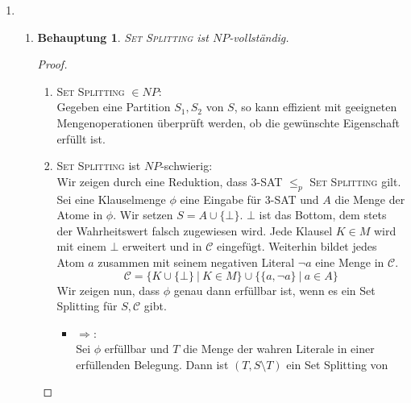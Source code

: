 \documentclass[a4paper]{scrartcl}
\newtheorem*{proposition}{Behauptung}
\begin{document}
\begin{enumerate}[label=\bfseries \arabic*.]
\item %
\begin{enumerate}
    \item %
        \begin{proposition}
            \textsc{Set Splitting} ist $NP$-vollständig.
        \end{proposition}
        \begin{proof}
            \hfill \\
            \begin{enumerate}
                \item \textsc{Set Splitting} $\in NP$: \\
                    Gegeben eine Partition $S_1,S_2$ von $S$, so kann effizient
                    mit geeigneten Mengenoperationen überprüft werden, ob die
                    gewünschte Eigenschaft erfüllt ist.
                \item \textsc{Set Splitting} ist $NP$-schwierig: \\
                    Wir zeigen durch eine Reduktion, dass 3-SAT $\leq_p$
                    \textsc{Set Splitting} gilt.
                    Sei eine Klauselmenge $\phi$ eine Eingabe für 3-SAT und $A$
                    die Menge der Atome in $\phi$.
                    Wir setzen $S = A \cup \{\bot\}$. $\bot$ ist das Bottom,
                    dem stets der Wahrheitswert falsch zugewiesen wird. 
                    Jede Klausel $K \in M$ wird mit einem $\bot$ erweitert und
                    in $\mathcal{C}$ eingefügt. Weiterhin bildet jedes Atom $a$
                    zusammen mit seinem negativen Literal $\lnot a$ eine Menge
                    in $\mathcal{C}$.
                    \begin{equation*}
                        \mathcal{C} =
                        \Big\{ K \cup \{\bot\}\ |\ K \in M \Big\}
                        \cup
                        \Big\{ \{a, \lnot a\}\ |\ a \in A \Big\}
                    \end{equation*}
                    Wir zeigen nun, dass $\phi$ genau dann erfüllbar ist, wenn
                    es ein Set Splitting für $S, \mathcal{C}$ gibt.
                    \begin{itemize}
                        \item $\Rightarrow$: \\
                            Sei $\phi$ erfüllbar und $T$ die Menge der wahren
                            Literale in einer erfüllenden Belegung.
                            Dann ist $(T, S \setminus T)$ ein Set Splitting von

\end{itemize}
\end{enumerate}
\end{proof}
\end{enumerate}
\end{enumerate}
\end{document}
